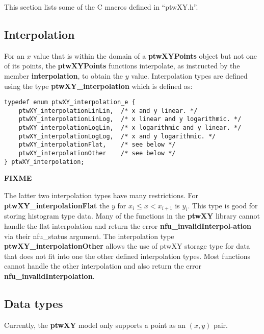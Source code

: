 \documentclass[11pt]{article}
\newcommand{\highlight}[1]{{\bf #1}}
\begin{document}
This section lists some of the C macros defined in ``ptwXY.h''.

\subsection{Interpolation} \label{interpolationSection}
For an $x$ value that is within the domain of a \highlight{ptwXYPoints} object but not one of its points, the \highlight{ptwXYPoints} 
functions interpolate, as instructed by the member \highlight{interpolation}, to obtain the $y$ value. Interpolation types are
defined using the type \highlight{ptwXY\_interpolation} which is defined as:
\begin{verbatim}
typedef enum ptwXY_interpolation_e { 
    ptwXY_interpolationLinLin,  /* x and y linear. */
    ptwXY_interpolationLinLog,  /* x linear and y logarithmic. */
    ptwXY_interpolationLogLin,  /* x logarithmic and y linear. */
    ptwXY_interpolationLogLog,  /* x and y logarithmic. */
    ptwXY_interpolationFlat,    /* see below */
    ptwXY_interpolationOther    /* see below */
} ptwXY_interpolation;
\end{verbatim}
\highlight{FIXME}

The latter two interpolation types have many restrictions. For \highlight{ptwXY\_interpolationFlat} the $y$ for $x_i \le x < x_{i+1}$ is $y_i$.
This type is good for storing histogram type data.
Many of the functions in the \highlight{ptwXY} library cannot handle the flat interpolation and return the error
\highlight{nfu\_invalidInterpol-ation} via their nfu\_status argument. The interpolation type \highlight{ptwXY\_interpolationOther}
allows the use of ptwXY storage type for data that does not fit into one the other defined interpolation types. Most
functions cannot handle the other interpolation and also return the error \highlight{nfu\_invalidInterpolation}.

\subsection{Data types}
Currently, the \highlight{ptwXY} model only supports a point as an $(x, y)$ pair. 
\end{document}
